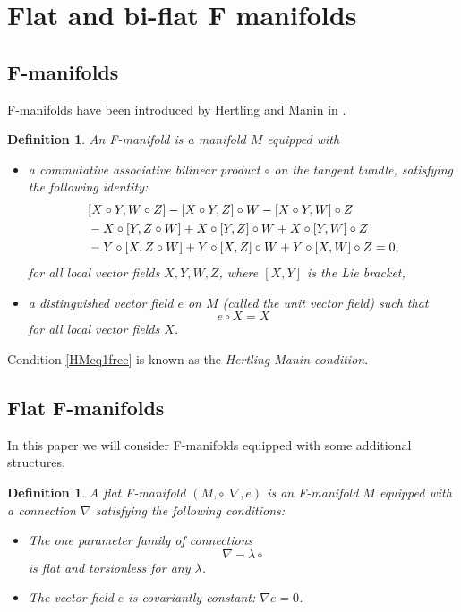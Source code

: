 \documentclass[11pt,a4paper]{amsart}
\numberwithin{equation}{section}
\newtheorem{definition}[theorem]{Definition}
\numberwithin{equation}{section}
\begin{document}
\section{Flat and bi-flat F manifolds}
\subsection{F-manifolds}
F-manifolds have been introduced by Hertling and Manin in \cite{HM}.
\begin{definition}\label{defFmani}
An \emph{F-manifold} is a manifold $M$ equipped with
\begin{itemize}
\item[(i)] a commutative associative bilinear product  $\circ$  on the tangent bundle, satisfying the following identity:
\begin{align}
&[X\circ Y,W\circ Z]-[X\circ Y, Z]\circ W-[X\circ Y, W]\circ Z\label{HMeq1free}\\
&-X\circ [Y, Z \circ W]+X\circ [Y, Z]\circ W +X\circ [Y, W]\circ Z\notag\\
&-Y\circ [X,Z\circ W]+Y\circ [X,Z]\circ W+Y\circ [X, W]\circ Z=0,\notag
\end{align}
for all local vector fields $X,Y,W, Z$, where $[X,Y]$ is the Lie bracket,
\newline
\item[(ii)] a distinguished vector field $e$ on $M$ (called the unit vector field)  such that 
\[e\circ X=X\] 
for all local vector fields $X$. 
\end{itemize}
\end{definition}
Condition \eqref{HMeq1free} is known as the \emph{Hertling-Manin condition}.

\subsection{Flat F-manifolds}
In this paper we will consider F-manifolds equipped with some additional structures.
\begin{definition}\cite{manin}
A flat F-manifold $(M, \circ, \nabla, e)$ is an F-manifold $M$ equipped with a connection
 $\nabla$ satisfying the following conditions:
\begin{itemize}
\item The one parameter family of connections
$$\nabla-\lambda\circ$$
is flat and torsionless for any $\lambda$.
\item
The vector field $e$ is covariantly constant: $\nabla e=0$.
\end{itemize}
\end{definition}
\end{document}
